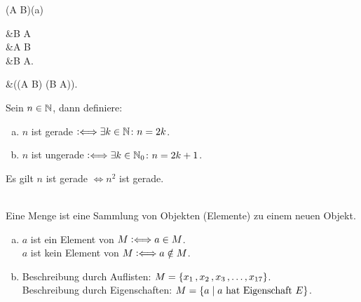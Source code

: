 \documentclass[../ana1.tex]{subfiles}
\begin{document}
\begin{bem}\leavevmode
	\begin{alignenum}{(A \Leftrightarrow B)}{(a)}
		\begin{aitem}
			 &\Leftrightarrow B  A\\
										  &\Leftrightarrow A  B\\
										  &\Leftrightarrow \neg B \Rightarrow \neg A.
		\end{aitem}\begin{aitem}
			 &\Leftrightarrow ((A \Rightarrow B) \wedge (B \Rightarrow A)).
		\end{aitem}
	\end{alignenum}
\end{bem}

\begin{defi*}
	Sein \(n \in \mathbb{N} \), dann definiere:
	\begin{enumerate}[(a)]
		\item \(n \) ist gerade \(\mathrel{\vcentcolon\Longleftrightarrow} \exists k \in \mathbb{N} \colon n = 2k \).
		\item \(n \) ist ungerade \(\mathrel{\vcentcolon\Longleftrightarrow} \exists k \in \mathbb{N}_{0} \colon n = 2k + 1 \).
	\end{enumerate}
\end{defi*}

\begin{bsp}
	Es gilt \(n \) ist gerade \(\iff n^2 \) ist gerade.
	\begin{bew}
	\end{bew}
\end{bsp}

\begin{defi*}\leavevmode \\
	Eine Menge ist eine Sammlung von Objekten (Elemente) zu einem neuen Objekt.
\end{defi*}

\begin{notation}\leavevmode
	\begin{enumerate}[(a)]
		\item \(a \) ist ein Element von \(M \mathrel{\vcentcolon\Longleftrightarrow} a \in M \).\\
			  \(a \) ist kein Element von \(M \mathrel{\vcentcolon\Longleftrightarrow} a \notin M \).
		\item Beschreibung durch Auflisten: \(M = \{x_{1} \operatorname{,} x_{2} \operatorname{,} x_{3} \operatorname{,} \ldots \operatorname{,} x_{17}\} \).\\
			  Beschreibung durch Eigenschaften: \(M = \{a \; \vert \; a \text{ hat Eigenschaft } E\} \).
	\end{enumerate}
\end{notation}
\end{document}
